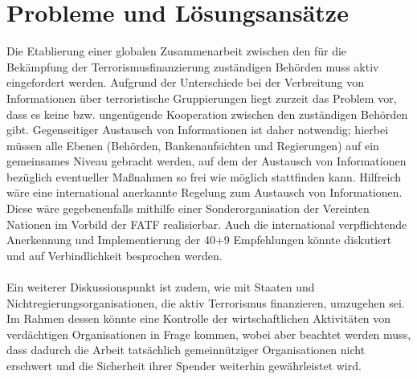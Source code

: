 \documentclass[a4paper,11pt]{article}
\begin{document}
    \section{Probleme und Lösungsansätze}
Die Etablierung einer globalen Zusammenarbeit zwischen den für die Bekämpfung der Terrorismusfinanzierung zuständigen Behörden muss aktiv eingefordert werden. Aufgrund der Unterschiede bei der Verbreitung von Informationen über terroristische Gruppierungen liegt zurzeit das Problem vor, dass es keine bzw. ungenügende Kooperation zwischen den zuständigen Behörden gibt. Gegenseitiger Austausch von Informationen ist daher notwendig; hierbei müssen alle Ebenen (Behörden, Bankenaufsichten und Regierungen) auf ein gemeinsames Niveau gebracht werden, auf dem der Austausch von Informationen bezüglich eventueller Maßnahmen so frei wie möglich stattfinden kann. Hilfreich wäre eine international anerkannte Regelung zum Austausch von Informationen. Diese wäre gegebenenfalls mithilfe einer Sonderorganisation der Vereinten Nationen im Vorbild der FATF realisierbar. Auch die international verpflichtende Anerkennung und Implementierung der 40+9 Empfehlungen könnte diskutiert und auf Verbindlichkeit besprochen werden.
\\ \\
Ein weiterer Diskussionspunkt ist zudem, wie mit Staaten und Nichtregierungsorganisationen, die aktiv Terrorismus finanzieren, umzugehen sei. Im Rahmen dessen könnte eine Kontrolle der wirtschaftlichen Aktivitäten von verdächtigen Organisationen in Frage kommen, wobei aber beachtet werden muss, dass dadurch die Arbeit tatsächlich gemeinnütziger Organisationen nicht erschwert und die Sicherheit ihrer Spender weiterhin gewährleistet wird.
\\ \\
\end{document}
